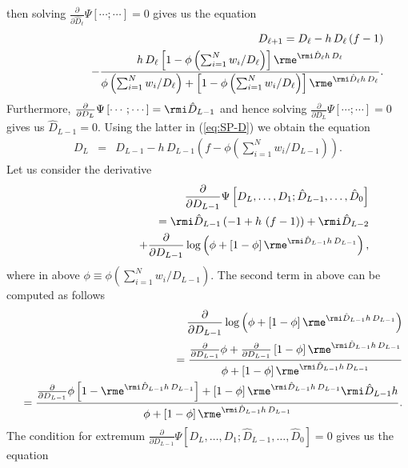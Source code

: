 \documentclass[10pt]{iopart}
\newcommand{\1}{\mathbf{1}}
\begin{document}
%
then solving $\frac{\partial}{\partial \hat{D}_\ell}\Psi\left[\cdots;\cdots\right]=0$ gives us the equation 
%
\begin{eqnarray}
%
&&D_{\ell+1}=D_{\ell}- h\,D_{\ell}\left(f- 1\right)\nonumber\\
&&~~~~~~~~~~~~~- \frac{h\,D_{\ell}\left[1-\phi\left(\sum_{i=1}^Nw_i/D_\ell\right)\right]\rme^{\rmi \hat{D}_\ell h\,D_{\ell}}}{\phi\left(\sum_{i=1}^Nw_i/D_\ell\right)+\left[1-\phi\left(\sum_{i=1}^Nw_i/D_\ell\right)\right]\rme^{\rmi \hat{D}_\ell h\,D_{\ell}}}\label{eq:SP-D}.
%
\end{eqnarray}
%
Furthermore, $\frac{\partial}{\partial D_L}\Psi\left[\cdots;\cdots\right]=\rmi \hat{D}_{L-1}$ and hence solving $\frac{\partial}{\partial D_L}\Psi\left[\cdots;\cdots\right]=0$ gives us $ \hat{D}_{L-1}=0$. Using the latter in (\ref{eq:SP-D}) we obtain the equation 
%
\begin{eqnarray}
%
D_{L}&=&D_{L-1}- h\,D_{L-1}\left(f- \phi\left(\sum_{i=1}^Nw_i/D_{L-1}\right)\right)\label{eq:SP-D-L+1}.
%
\end{eqnarray}
%
Let us consider the derivative
%
\begin{eqnarray}
&&\frac{\partial}{\partial D_{L-1}}\Psi\left[D_{L},\ldots,D_{1};\hat{D}_{L-1},\ldots,\hat{D}_0\right]\nonumber\\
%
&&~~~~~~~~~~~~~~=\rmi \hat{D}_{L-1}\left(- 1+ h\,\left(f- 1\right)\right)+\rmi \hat{D}_{L-2}\nonumber\\
&&~~~~~~~~~~~~~~~~~~~~~~+\frac{\partial}{\partial D_{L-1}}\log\left( \phi+\left[1-\phi\right]\rme^{\rmi \hat{D}_{L-1} h\,D_{L-1} }\right),
%
\end{eqnarray}
%
where in above $\phi\equiv\phi\left(\sum_{i=1}^Nw_i/D_{L-1}\right)$. The second term in above can be computed as follows
%
\begin{eqnarray}
%
&&\frac{\partial}{\partial D_{L-1}}\log\left( \phi+\left[1-\phi\right]\rme^{\rmi \hat{D}_{L-1} h\,D_{L-1} }\right)\nonumber\\
%
&&=
\frac{\frac{\partial}{\partial D_{L-1}}\phi+\frac{\partial}{\partial D_{L-1}}\left[1-\phi\right]\rme^{\rmi \hat{D}_{L-1} h\,D_{L-1} }}{\phi+\left[1-\phi\right]\rme^{\rmi \hat{D}_{L-1} h\,D_{L-1} }}\nonumber\\
%
&&=
\frac{\frac{\partial}{\partial D_{L-1}}\phi\left[1-\rme^{\rmi \hat{D}_{L-1} h\,D_{L-1} }\right]+\left[1-\phi\right]\rme^{\rmi \hat{D}_{L-1} h\,D_{L-1} }\rmi \hat{D}_{L-1} h}{\phi+\left[1-\phi\right]\rme^{\rmi \hat{D}_{L-1} h\,D_{L-1} }}.
%
\end{eqnarray}
%
The condition for extremum $\frac{\partial}{\partial D_{L-1}}\Psi\left[D_{L},\ldots,D_{1};\hat{D}_{L-1},\ldots,\hat{D}_0\right]=0$ gives us the equation
\end{document}
